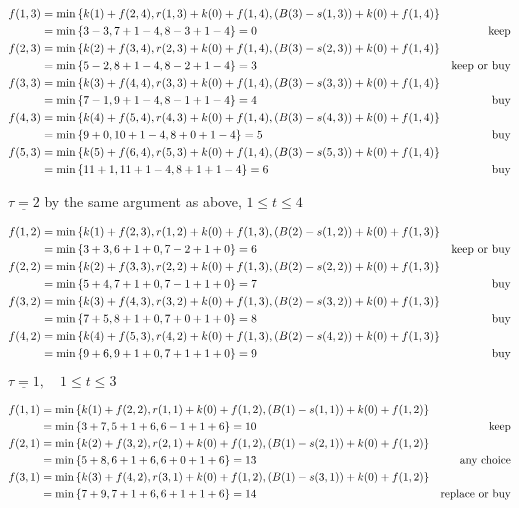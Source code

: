 \begin{prob}
\begin{enumerate}[label = {\textbf{(\greek*)}}]
\begin{sol}
\begin{enumerate}[start = 1, label = {\protect\tsc{$\mathbf{S_{\arabic*}}$}}]
$\begin{aligned}
f(1,3) &= \min\left\{k(1)+f(2,4),r(1,3)+k(0)+f(1,4),\left(B(3)-s(1,3)\right)+k(0)+f(1,4)\right\}\\
&= \min\left\{3-3,7+1-4,8-3+1-4\right\}=0 &\text{keep} \\
f(2,3) &= \min\left\{k(2)+f(3,4),r(2,3)+k(0)+f(1,4),\left(B(3)-s(2,3)\right)+k(0)+f(1,4)\right\}\\
&= \min\left\{5-2,8+1-4,8-2+1-4\right\}=3 &\text{keep or buy} \\
f(3,3) &= \min\left\{k(3)+f(4,4),r(3,3)+k(0)+f(1,4),\left(B(3)-s(3,3)\right)+k(0)+f(1,4)\right\}\\
&= \min\left\{7-1,9+1-4,8-1+1-4\right\}=4 &\text{buy} \\
f(4,3) &= \min\left\{k(4)+f(5,4),r(4,3)+k(0)+f(1,4),\left(B(3)-s(4,3)\right)+k(0)+f(1,4)\right\}\\
&= \min\left\{9+0,10+1-4,8+0+1-4\right\}=5 &\text{buy} \\
f(5,3) &= \min\left\{k(5)+f(6,4),r(5,3)+k(0)+f(1,4),\left(B(3)-s(5,3)\right)+k(0)+f(1,4)\right\}\\
&= \min\left\{11+1,11+1-4,8+1+1-4\right\}=6 &\text{buy} 
\end{aligned}$

$\underline{\tau=2}$ by the same argument as above, $1\leq t\leq 4$ 

$\begin{aligned}
f(1,2) &= \min\left\{k(1)+f(2,3),r(1,2)+k(0)+f(1,3),\left(B(2)-s(1,2)\right)+k(0)+f(1,3)\right\}\\
&= \min\left\{3+3,6+1+0,7-2+1+0\right\}=6 &\text{keep or buy} \\
f(2,2) &= \min\left\{k(2)+f(3,3),r(2,2)+k(0)+f(1,3),\left(B(2)-s(2,2)\right)+k(0)+f(1,3)\right\}\\
&= \min\left\{5+4,7+1+0,7-1+1+0\right\}=7 &\text{buy} \\
f(3,2) &= \min\left\{k(3)+f(4,3),r(3,2)+k(0)+f(1,3),\left(B(2)-s(3,2)\right)+k(0)+f(1,3)\right\}\\
&= \min\left\{7+5,8+1+0,7+0+1+0\right\}=8 &\text{buy} \\
f(4,2) &= \min\left\{k(4)+f(5,3),r(4,2)+k(0)+f(1,3),\left(B(2)-s(4,2)\right)+k(0)+f(1,3)\right\}\\
&= \min\left\{9+6,9+1+0,7+1+1+0\right\}=9 &\text{buy} 
\end{aligned}$

$\underline{\tau=1},\quad 1\leq t\leq 3$ 

$\begin{aligned}
f(1,1) &= \min\left\{k(1)+f(2,2),r(1,1)+k(0)+f(1,2),\left(B(1)-s(1,1)\right)+k(0)+f(1,2)\right\}\\
&= \min\left\{3+7,5+1+6,6-1+1+6\right\}=10 &\text{keep} \\
f(2,1) &= \min\left\{k(2)+f(3,2),r(2,1)+k(0)+f(1,2),\left(B(1)-s(2,1)\right)+k(0)+f(1,2)\right\}\\
&= \min\left\{5+8,6+1+6,6+0+1+6\right\}=13 &\text{any choice} \\
f(3,1) &= \min\left\{k(3)+f(4,2),r(3,1)+k(0)+f(1,2),\left(B(1)-s(3,1)\right)+k(0)+f(1,2)\right\}\\
&= \min\left\{7+9,7+1+6,6+1+1+6\right\}=14 &\text{replace or buy} 
\end{aligned}$


\end{enumerate}
\end{sol}
\end{enumerate}
\end{prob}
